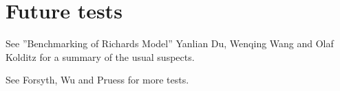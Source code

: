 \documentclass[]{scrreprt}
\begin{document}
\chapter{Future tests}

See ''Benchmarking of Richards Model'' Yanlian Du, Wenqing Wang and
Olaf Kolditz for a summary of the usual suspects.

See Forsyth, Wu and Pruess for more tests.
\end{document}
